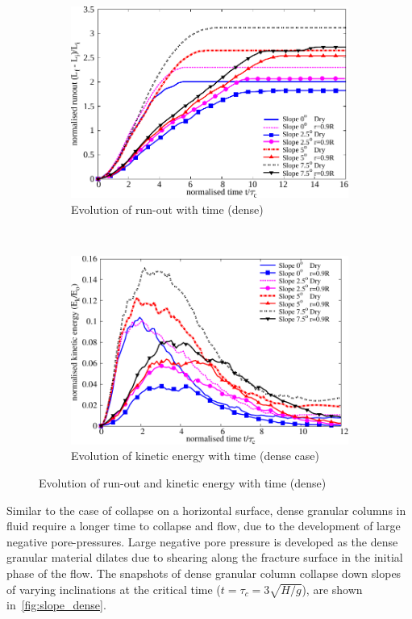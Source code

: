 \begin{figure}
\centering
\begin{subfigure}[t]{0.95\textwidth}
\centering
\includegraphics[width=0.95\columnwidth]{Runout_dense_slope}
\caption{Evolution of run-out with time (dense)}
\label{fig:run_dense}
\end{subfigure}\\
\begin{subfigure}[t]{0.95\textwidth}
\centering
\includegraphics[width=0.95\columnwidth]{KE_dense_slope}
\caption{Evolution of kinetic energy with time (dense case)}
\label{fig:KE_dense}
\end{subfigure}
\caption{Evolution of run-out and kinetic energy with time (dense)}
\label{fig:run_KE_dense}
\end{figure}

Similar to the case of collapse on a horizontal surface, dense granular columns 
in fluid require a longer time to collapse and flow, due to the development of 
large negative pore-pressures. Large negative pore pressure is developed as the 
dense granular material dilates due to shearing along the fracture surface in 
the initial phase of the flow. The snapshots of dense granular column collapse 
down slopes of varying inclinations at the critical time 
($t=\tau_{c}=3\sqrt{H/g}$), are shown in~\cref{fig:slope_dense}.

